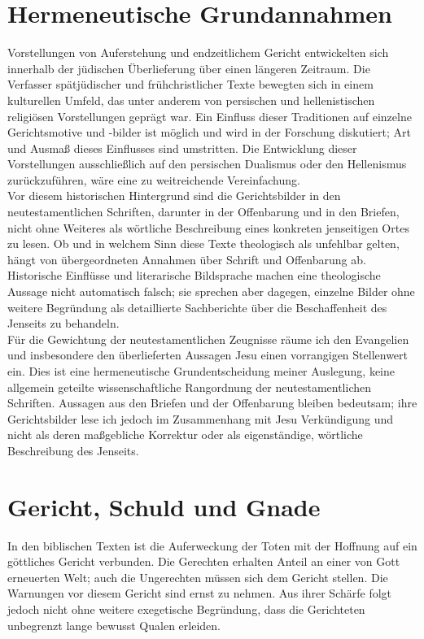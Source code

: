 \section{Hermeneutische Grundannahmen}

Vorstellungen von Auferstehung und endzeitlichem Gericht entwickelten sich innerhalb der jüdischen Überlieferung über einen längeren Zeitraum. Die Verfasser spätjüdischer und frühchristlicher Texte bewegten sich in einem kulturellen Umfeld, das unter anderem von persischen und hellenistischen religiösen Vorstellungen geprägt war. Ein Einfluss dieser Traditionen auf einzelne Gerichtsmotive und -bilder ist möglich und wird in der Forschung diskutiert; Art und Ausmaß dieses Einflusses sind umstritten. Die Entwicklung dieser Vorstellungen ausschließlich auf den persischen Dualismus oder den Hellenismus zurückzuführen, wäre eine zu weitreichende Vereinfachung.
\\

Vor diesem historischen Hintergrund sind die Gerichtsbilder in den neutestamentlichen Schriften, darunter in der Offenbarung und in den Briefen, nicht ohne Weiteres als wörtliche Beschreibung eines konkreten jenseitigen Ortes zu lesen. Ob und in welchem Sinn diese Texte theologisch als unfehlbar gelten, hängt von übergeordneten Annahmen über Schrift und Offenbarung ab. Historische Einflüsse und literarische Bildsprache machen eine theologische Aussage nicht automatisch falsch; sie sprechen aber dagegen, einzelne Bilder ohne weitere Begründung als detaillierte Sachberichte über die Beschaffenheit des Jenseits zu behandeln.
\\

Für die Gewichtung der neutestamentlichen Zeugnisse räume ich den Evangelien und insbesondere den überlieferten Aussagen Jesu einen vorrangigen Stellenwert ein. Dies ist eine hermeneutische Grundentscheidung meiner Auslegung, keine allgemein geteilte wissenschaftliche Rangordnung der neutestamentlichen Schriften. Aussagen aus den Briefen und der Offenbarung bleiben bedeutsam; ihre Gerichtsbilder lese ich jedoch im Zusammenhang mit Jesu Verkündigung und nicht als deren maßgebliche Korrektur oder als eigenständige, wörtliche Beschreibung des Jenseits.

\section{Gericht, Schuld und Gnade}

In den biblischen Texten ist die Auferweckung der Toten mit der Hoffnung auf ein göttliches Gericht verbunden. Die Gerechten erhalten Anteil an einer von Gott erneuerten Welt; auch die Ungerechten müssen sich dem Gericht stellen. Die Warnungen vor diesem Gericht sind ernst zu nehmen. Aus ihrer Schärfe folgt jedoch nicht ohne weitere exegetische Begründung, dass die Gerichteten unbegrenzt lange bewusst Qualen erleiden.
\\

